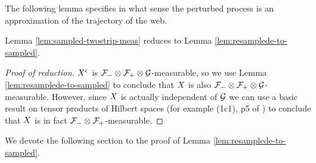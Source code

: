 {The following lemma specifies in what sense the perturbed process is
an approximation of the trajectory of the web.

\begin{lemma}
  \label{lem:resamplede-to-sampled}
  \statementoflemresampledetosampled
\end{lemma}

Lemma \ref{lem:sampled-twostrip-meas} reduces to Lemma
\ref{lem:resamplede-to-sampled}.

\begin{proof}[Proof of reduction]
  $X^{\epsilon}$ is $\mathcal{F}_{-} \otimes \mathcal{F}_{+} \otimes \mathcal{G}$-measurable, so we use Lemma
  \ref{lem:resamplede-to-sampled} to conclude that $X$ is also
  $\mathcal{F}_{-} \otimes \mathcal{F}_{+} \otimes \mathcal{G}$-measurable.  However, since $X$ is
  actually independent of $\mathcal{G}$ we can use a basic result on
  tensor products of Hilbert spaces (for example (1c1), p5 of
  \cite{tsirelson-completion}) to conclude that $X$ is
  in fact $\mathcal{F}_{-} \otimes \mathcal{F}_{+}$-measurable.
\end{proof}

We devote the following section to the proof of Lemma
\ref{lem:resamplede-to-sampled}.
}
